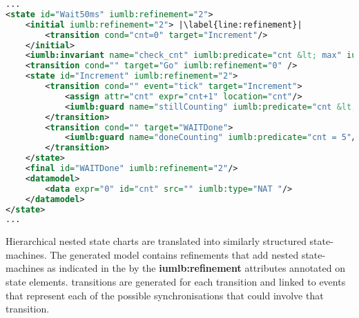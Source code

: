 \begin{lstlisting}[caption={\textbf{Wait50ms} state snippet of \SCXML model representation illustrating the use of different \SCXML modeling features, as well as, added syntax extensions},label={lst:secBot}, language=xml, escapechar=|, frame=single]
...
<state id="Wait50ms" iumlb:refinement="2">
	<initial iumlb:refinement="2"> |\label{line:refinement}|
		<transition cond="cnt=0" target="Increment"/> 
	</initial>
	<iumlb:invariant name="check_cnt" iumlb:predicate="cnt &lt; max" iumlb:refinement="2"/> |\label{line:invariant}|
	<transition cond="" target="Go" iumlb:refinement="0" />
	<state id="Increment" iumlb:refinement="2">
		<transition cond="" event="tick" target="Increment">
			<assign attr="cnt" expr="cnt+1" location="cnt"/>
			<iumlb:guard name="stillCounting" iumlb:predicate="cnt &lt; 5"/> |\label{line:predicate}|
		</transition>
		<transition cond="" target="WAITDone">
			<iumlb:guard name="doneCounting" iumlb:predicate="cnt = 5"/> |\label{line:guard}|
    	</transition>
	</state>
	<final id="WAITDone" iumlb:refinement="2"/>
	<datamodel>
		<data expr="0" id="cnt" src="" iumlb:type="NAT "/>
	</datamodel>
</state>
...
\end{lstlisting}


Hierarchical nested state charts are translated into similarly structured \iUMLB state-machines. The generated \iUMLB model contains refinements that add nested state-machines as indicated in the  \SCXML \statechart by the \textbf{iumlb:refinement} attributes annotated on state elements. \iUMLB transitions are generated for each \SCXML transition and linked to \EventB events that represent each of the possible synchronisations that could involve that transition.


